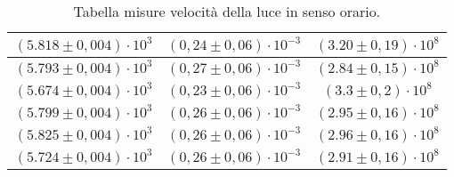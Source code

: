 \begin{table}[H]
\begin{tabular}{|c|c|c|}
        \hline
        $ (5.818 \pm 0,004) \cdot 10^{3} $ & $ (0,24 \pm 0,06) \cdot 10^{-3} $ & $ (3.20 \pm 0,19) \cdot 10^{8} $\\
        \hline
        $ (5.793 \pm 0,004) \cdot 10^{3} $ & $ (0,27 \pm 0,06) \cdot 10^{-3} $ & $ (2.84 \pm 0,15) \cdot 10^{8} $\\
        \hline
        $ (5.674 \pm 0,004) \cdot 10^{3} $ & $ (0,23 \pm 0,06) \cdot 10^{-3} $ & $ (3.3 \pm 0,2) \cdot 10^{8} $\\
        \hline
        $ (5.799 \pm 0,004) \cdot 10^{3} $ & $ (0,26 \pm 0,06) \cdot 10^{-3} $ & $ (2.95 \pm 0,16) \cdot 10^{8} $\\
        \hline
        $ (5.825 \pm 0,004) \cdot 10^{3} $ & $ (0,26 \pm 0,06) \cdot 10^{-3} $ & $ (2.96 \pm 0,16) \cdot 10^{8} $\\
        \hline
        $ (5.724 \pm 0,004) \cdot 10^{3} $ & $ (0,26 \pm 0,06) \cdot 10^{-3} $ & $ (2.91 \pm 0,16) \cdot 10^{8} $\\
        \hline
        \end{tabular}
    \caption{Tabella misure velocità della luce in senso orario.}
\end{table}
